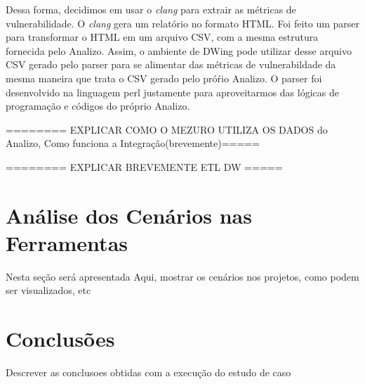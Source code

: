 Dessa forma, decidimos em usar o \emph{clang} para extrair as métricas de vulnerabilidade. O \emph{clang} gera um relatório no formato HTML. Foi feito um parser para transformar o HTML em um arquivo CSV, com a mesma estrutura fornecida pelo Analizo. Assim, o ambiente de DWing pode utilizar desse arquivo CSV gerado pelo parser para se alimentar das métricas de vulnerabildade da mesma maneira que trata o CSV gerado pelo próŕio Analizo. O parser foi desenvolvido na linguagem perl justamente para aproveitarmos das lógicas de programação e códigos do próprio Analizo.

======== EXPLICAR COMO O MEZURO UTILIZA OS DADOS do Analizo, Como funciona a Integração(brevemente)=====


======== EXPLICAR BREVEMENTE ETL DW =====



\section{Análise dos Cenários nas Ferramentas}

Nesta seção será apresentada Aqui, mostrar os cenários nos projetos, como podem ser visualizados, etc


\section{Conclusões}

Descrever as conclusoes obtidas com a execução do estudo de caso